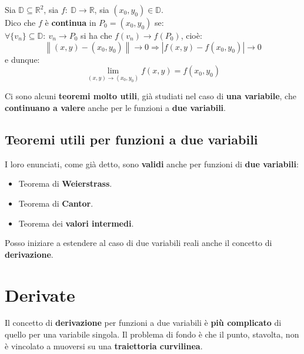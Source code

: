 \documentclass[a4paper, oneside]{article}
\newcommand\R{\mathbb{R}}
\newcommand\D{\mathbb{D}}
\begin{document}
    \begin{definition}
        Sia $\D \subseteq \R^2$, sia $f: \ \D\to\R$, sia $(x_0,y_0)\in\D$.\\
        Dico che $f$ è \textbf{continua} in $P_0 = (x_0,y_0)$ se:\\
        $\forall\{v_n\}\subseteq\D: \ v_n\to P_0$ si ha che $f(v_n)\to f(P_0)$, cioè:
        \[\left\lVert (x,y) - (x_0,y_0)\right\rVert\to 0 \Longrightarrow \left|f(x,y) - f(x_0,y_0)\right|\to 0\]
        e dunque:
        \[\lim_{(x,y)\to(x_0,y_0)} f(x,y) = f(x_0,y_0)\]
    \end{definition}

    \noindent Ci sono alcuni \textbf{teoremi molto utili}, già studiati nel caso di \textbf{una variabile}, che \textbf{continuano a valere} anche per le funzioni a \textbf{due variabili}.

    \subsection{Teoremi utili per funzioni a due variabili}
    I loro enunciati, come già detto, sono \textbf{validi} anche per funzioni di \textbf{due variabili}:
    \begin{itemize}
        \item Teorema di \textbf{Weierstrass}.
        \item Teorema di \textbf{Cantor}.
        \item Teorema dei \textbf{valori intermedi}.
    \end{itemize}
    Posso iniziare a estendere al caso di due variabili reali anche il concetto di \textbf{derivazione}.

    \newpage

    \section{Derivate}
    Il concetto di \textbf{derivazione} per funzioni a due variabili è \textbf{più complicato} di quello per una variabile singola.
    Il problema di fondo è che il punto, stavolta, non è vincolato a muoversi su una \textbf{traiettoria curvilinea}.\\
\end{document}
